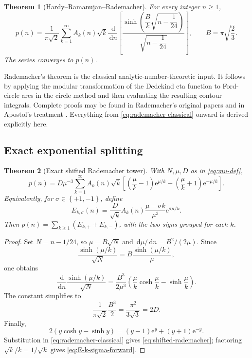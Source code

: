 \documentclass[11pt]{article}
\numberwithin{equation}{section}
\theoremstyle{mainthm}
\newtheorem{theorem}{Theorem}[section]
\theoremstyle{defstyle}
\theoremstyle{remark}
\newcommand{\e}{\mathrm e}
\newcommand{\dd}{\,\mathrm d}
\newcommand{\set}[1]{\left\{#1\right\}}
\begin{document}
\begin{theorem}[Hardy--Ramanujan--Rademacher]\label{thm:rademacher-classical}
For every integer \(n\ge1\),
\begin{equation}\label{eq:rademacher-classical}
 p(n)=\frac1{\pi\sqrt2}\sum_{k=1}^{\infty}A_k(n)\sqrt{k}
 \frac{\dd}{\dd n}
 \left[
 \frac{\sinh\!\left(\dfrac{B}{k}\sqrt{n-\dfrac1{24}}\right)}
      {\sqrt{n-\dfrac1{24}}}
 \right],
 \qquad B=\pi\sqrt{\frac23}.
\end{equation}
The series converges to \(p(n)\).
\end{theorem}

Rademacher's theorem is the classical analytic-number-theoretic input.  It follows by applying the modular transformation of the Dedekind eta function to Ford-circle arcs in the circle method and then evaluating the resulting contour integrals.  Complete proofs may be found in Rademacher's original papers and in Apostol's treatment \cite{Rademacher1937,Rademacher1938,Apostol}.  Everything from \cref{eq:rademacher-classical} onward is derived explicitly here.

\subsection{Exact exponential splitting}

\begin{theorem}[Exact shifted Rademacher tower]\label{thm:shifted-rademacher}
With \(N,\mu,D\) as in \eqref{eq:mu-def},
\begin{equation}\label{eq:shifted-rademacher}
 \boxed{
 p(n)=D\mu^{-3}\sum_{k=1}^{\infty}A_k(n)\sqrt{k}
 \left[
 \left(\frac\mu k-1\right)\e^{\mu/k}
 +\left(\frac\mu k+1\right)\e^{-\mu/k}
 \right].}
\end{equation}
Equivalently, for \(\sigma\in\set{+1,-1}\), define
\begin{equation}\label{eq:E-k-sigma-forward}
 E_{k,\sigma}(n)=
 \frac{D}{\sqrt{k}}A_k(n)\frac{\mu-\sigma k}{\mu^3}
 \e^{\sigma\mu/k}.
\end{equation}
Then \(p(n)=\sum_{k\ge1}(E_{k,+}+E_{k,-})\), with the two signs grouped for each \(k\).
\end{theorem}

\begin{proof}
Set \(N=n-1/24\), so \(\mu=B\sqrt N\) and
\(
 \dd\mu/\dd n=B^2/(2\mu).
\)
Since
\[
 \frac{\sinh(\mu/k)}{\sqrt N}
 =B\frac{\sinh(\mu/k)}{\mu},
\]
one obtains
\[
 \frac{\dd}{\dd n}\frac{\sinh(\mu/k)}{\sqrt N}
 =\frac{B^3}{2\mu^3}
 \left(\frac\mu k\cosh\frac\mu k-\sinh\frac\mu k\right).
\]
The constant simplifies to
\[
 \frac1{\pi\sqrt2}\frac{B^3}{2}=\frac{\pi^2}{3\sqrt3}=2D.
\]
Finally,
\[
 2\left(y\cosh y-\sinh y\right)
 =(y-1)\e^y+(y+1)\e^{-y}.
\]
Substitution in \eqref{eq:rademacher-classical} gives \eqref{eq:shifted-rademacher}; factoring \(\sqrt{k}/k=1/\sqrt{k}\) gives \eqref{eq:E-k-sigma-forward}.
\end{proof}
\end{document}
